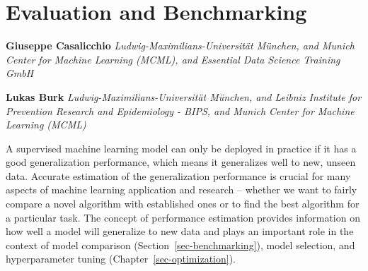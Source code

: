 \hypertarget{sec-performance}{%
\chapter{Evaluation and Benchmarking}\label{sec-performance}}

\vspace{-15mm}

\textbf{Giuseppe Casalicchio} \newline 
\emph{Ludwig-Maximilians-Universität München, and Munich Center for
Machine Learning (MCML), and Essential Data Science Training GmbH}

\textbf{Lukas Burk} \newline  \emph{Ludwig-Maximilians-Universität
München, and Leibniz Institute for Prevention Research and Epidemiology
- BIPS, and Munich Center for Machine Learning (MCML)}
\newline \newline 

A supervised machine learning model can only be deployed in practice if
it has a good generalization
performance, which means it generalizes well to new,
unseen data. Accurate estimation of the generalization performance is
crucial for many aspects of machine learning application and research --
whether we want to fairly compare a novel algorithm with established
ones or to find the best algorithm for a particular task. The concept of
performance estimation provides
information on how well a model will generalize to new data and plays an
important role in the context of model comparison
(Section~\ref{sec-benchmarking}), model selection, and hyperparameter
tuning (Chapter~\ref{sec-optimization}).

